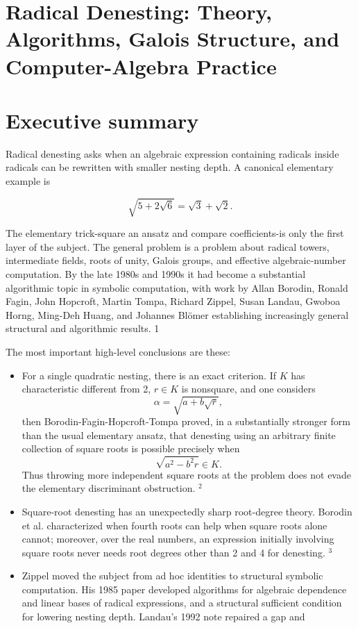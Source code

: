\documentclass[10pt]{article}
\begin{document}
\section*{Radical Denesting: Theory, Algorithms, Galois Structure, and Computer-Algebra Practice}
\section*{Executive summary}
Radical denesting asks when an algebraic expression containing radicals inside radicals can be rewritten with smaller nesting depth. A canonical elementary example is

$$
\sqrt{5+2 \sqrt{6}}=\sqrt{3}+\sqrt{2} .
$$

The elementary trick-square an ansatz and compare coefficients-is only the first layer of the subject. The general problem is a problem about radical towers, intermediate fields, roots of unity, Galois groups, and effective algebraic-number computation. By the late 1980s and 1990s it had become a substantial algorithmic topic in symbolic computation, with work by Allan Borodin, Ronald Fagin, John Hopcroft, Martin Tompa, Richard Zippel, Susan Landau, Gwoboa Horng, Ming-Deh Huang, and Johannes Blömer establishing increasingly general structural and algorithmic results. 1

The most important high-level conclusions are these:

\begin{itemize}
  \item[1.] For a single quadratic nesting, there is an exact criterion. If $K$ has characteristic different from 2, $r \in K$ is nonsquare, and one considers
$$
\alpha=\sqrt{a+b \sqrt{r}},
$$
then Borodin-Fagin-Hopcroft-Tompa proved, in a substantially stronger form than the usual elementary ansatz, that denesting using an arbitrary finite collection of square roots is possible precisely when
$$
\sqrt{a^{2}-b^{2} r} \in K .
$$
Thus throwing more independent square roots at the problem does not evade the elementary discriminant obstruction. ${ }^{2}$
  \item[2.] Square-root denesting has an unexpectedly sharp root-degree theory. Borodin et al. characterized when fourth roots can help when square roots alone cannot; moreover, over the real numbers, an expression initially involving square roots never needs root degrees other than 2 and 4 for denesting. ${ }^{3}$
  \item[3.] Zippel moved the subject from ad hoc identities to structural symbolic computation. His 1985 paper developed algorithms for algebraic dependence and linear bases of radical expressions, and a structural sufficient condition for lowering nesting depth. Landau's 1992 note repaired a gap and
\end{itemize}
\end{document}
